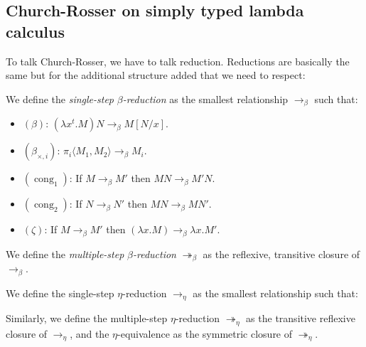 \subsection{Church-Rosser on simply typed lambda calculus}

To talk Church-Rosser, we have to talk reduction. Reductions are basically the same but for the additional structure added that we need to respect: 

\begin{definition}
  We define the \emph{single-step} $\beta$\emph{-reduction} as the smallest relationship $\to_\beta$ such that:
\begin{itemize}
\item[]$(\beta)$: $ (\lambda x^t.M)N \to_\beta M[N/x]$.\\
\item[]$(\beta_{\times,i})$: $\pi_i\langle M_1,M_2\rangle \to_\beta M_i$.\\
\item[]$(\operatorname{cong}_1)$: If $ M \to_\beta M'$ then $MN \to_\beta M'N$.\\
\item[]$(\operatorname{cong}_2)$: If $ N \to_\beta N'$ then $ MN \to_\beta MN'$.\\
\item[]$(\zeta)$: If $M\to_\beta M'$ then $(\lambda x.M) \to_\beta \lambda x.M'$.\\
\end{itemize}
We define the \emph{multiple-step} $\beta$\emph{-reduction} $\twoheadrightarrow_\beta$ as the reflexive, transitive closure of $\to_\beta$.
\end{definition}

\begin{definition}
We define the single-step $\eta$-reduction $\to_\eta$ as the smallest relationship such that: 
\begin{itemize}
\item[]$(\eta)$: $(\lambda x.Mx) \to_\eta M}$,para todo $ x \not  \in FV(M)$.\\
\item[]$(\eta_1)$: $\langle\pi_1 M, \pi_2 M\rangle\to_\eta M$.\\
\item[]$(\eta_\times)$: If $M:1$ then $M \to_\eta *$ . \\
\item[]$(\operatorname{cong}_1)$: If $ M \to_\eta M'$ then $MN \to_\eta M'N$.\\
\item[]$(\operatorname{cong}_2)$: If $ N \to_\eta N'$ then $ MN \to_\eta MN'$.\\
\item[]$(\zeta)$: If $M\to_\eta M'$ then $(\lambda x.M) \to_\eta \lambda x.M'$.\\
\end{itemize}

  Similarly, we define the multiple-step $\eta$-reduction $\twoheadrightarrow_\eta$ as the transitive reflexive closure of $\to_\eta$, and the $\eta$-equivalence as the symmetric closure of $\twoheadrightarrow_\eta$.
\end{definition}

